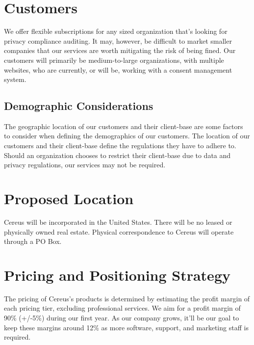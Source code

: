 
\section{Customers}

We offer flexible subscriptions for any sized organization that's looking for privacy compliance auditing. It may, however, be difficult to market smaller companies that our services are worth mitigating the risk of being fined. Our customers will primarily be medium-to-large organizations, with multiple websites, who are currently, or will be, working with a consent management system.

\subsection{Demographic Considerations}

The geographic location of our customers and their client-base are some factors to consider when defining the demographics of our customers. The location of our customers and their client-base define the regulations they have to adhere to. Should an organization chooses to restrict their client-base due to data and privacy regulations, our services may not be required.


\section{Proposed Location}

Cereus will be incorporated in the United States. There will be no leased or physically owned real estate. Physical correspondence to Cereus will operate through a PO Box. 


\section{Pricing and Positioning Strategy} \label{price.position.strat}

The pricing of Cereus's products is determined by estimating the profit margin of each pricing tier, excluding professional services. We aim for a profit margin of 90\% (+/-5\%) during our first year. As our company grows, it'll be our goal to keep these margins around 12\% as more software, support, and marketing staff is required. 

